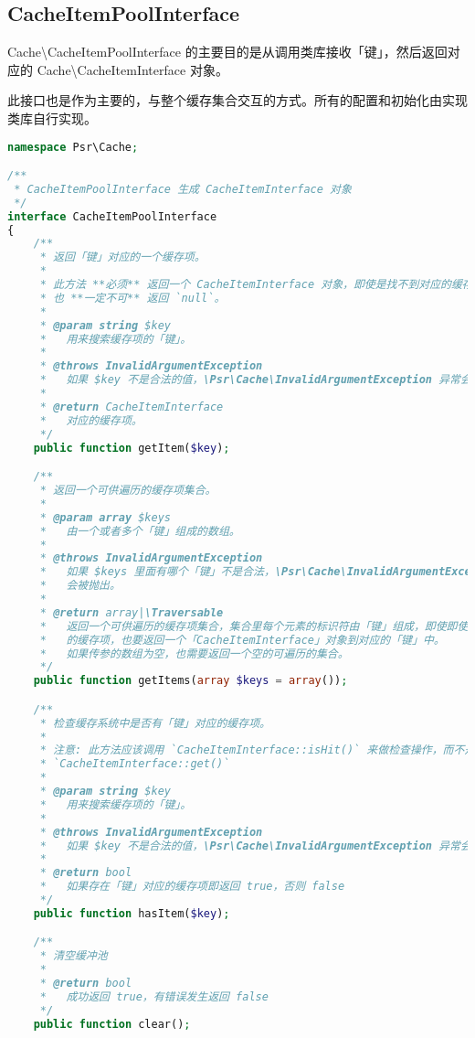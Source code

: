 \subsection{CacheItemPoolInterface}

Cache\textbackslash CacheItemPoolInterface 的主要目的是从调用类库接收「键」，然后返回对应的 Cache\textbackslash CacheItemInterface 对象。

此接口也是作为主要的，与整个缓存集合交互的方式。所有的配置和初始化由实现类库自行实现。




\begin{lstlisting}[language=PHP]
namespace Psr\Cache;

/**
 * CacheItemPoolInterface 生成 CacheItemInterface 对象
 */
interface CacheItemPoolInterface
{
    /**
     * 返回「键」对应的一个缓存项。
     *
     * 此方法 **必须** 返回一个 CacheItemInterface 对象，即使是找不到对应的缓存项
     * 也 **一定不可** 返回 `null`。
     *
     * @param string $key
     *   用来搜索缓存项的「键」。
     *
     * @throws InvalidArgumentException
     *   如果 $key 不是合法的值，\Psr\Cache\InvalidArgumentException 异常会被抛出。
     *
     * @return CacheItemInterface
     *   对应的缓存项。
     */
    public function getItem($key);

    /**
     * 返回一个可供遍历的缓存项集合。
     *
     * @param array $keys
     *   由一个或者多个「键」组成的数组。
     *
     * @throws InvalidArgumentException
     *   如果 $keys 里面有哪个「键」不是合法，\Psr\Cache\InvalidArgumentException 异常
     *   会被抛出。
     *   
     * @return array|\Traversable
     *   返回一个可供遍历的缓存项集合，集合里每个元素的标识符由「键」组成，即使即使是找不到对
     *   的缓存项，也要返回一个「CacheItemInterface」对象到对应的「键」中。
     *   如果传参的数组为空，也需要返回一个空的可遍历的集合。
     */
    public function getItems(array $keys = array());

    /**
     * 检查缓存系统中是否有「键」对应的缓存项。
     *
     * 注意: 此方法应该调用 `CacheItemInterface::isHit()` 来做检查操作，而不是
     * `CacheItemInterface::get()`
     *
     * @param string $key
     *   用来搜索缓存项的「键」。
     *
     * @throws InvalidArgumentException
     *   如果 $key 不是合法的值，\Psr\Cache\InvalidArgumentException 异常会被抛出。
     *
     * @return bool
     *   如果存在「键」对应的缓存项即返回 true，否则 false
     */
    public function hasItem($key);

    /**
     * 清空缓冲池
     *
     * @return bool
     *   成功返回 true，有错误发生返回 false
     */
    public function clear();


\end{lstlisting}
